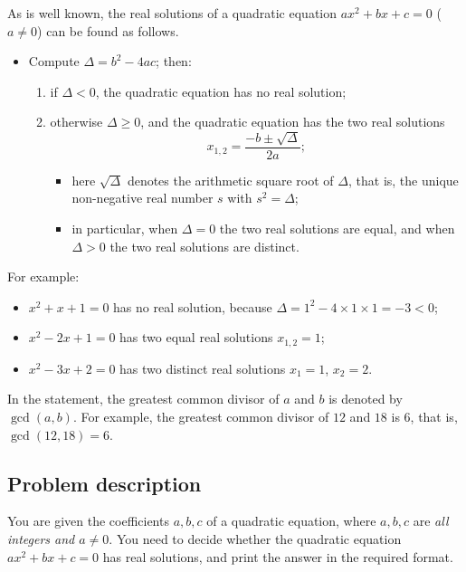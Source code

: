 \documentclass[11pt]{article}
\begin{document}
As is well known, the real solutions of a quadratic equation
$ax^2 + bx + c = 0$ ($a \ne 0$) can be found as follows.
\begin{itemize}
\item Compute $\Delta = b^2 - 4ac$; then:
  \begin{enumerate}
  \item if $\Delta < 0$, the quadratic equation has no real solution;
  \item otherwise $\Delta \ge 0$, and the quadratic equation has the two
    real solutions
    \[
      x_{1,2} = \frac{-b \pm \sqrt{\Delta}}{2a};
    \]
    \begin{itemize}
    \item here $\sqrt{\Delta}$ denotes the arithmetic square root of
      $\Delta$, that is, the unique non-negative real number $s$ with
      $s^2 = \Delta$;
    \item in particular, when $\Delta = 0$ the two real solutions are
      equal, and when $\Delta > 0$ the two real solutions are distinct.
    \end{itemize}
  \end{enumerate}
\end{itemize}
For example:
\begin{itemize}
\item $x^2 + x + 1 = 0$ has no real solution, because
  $\Delta = 1^2 - 4 \times 1 \times 1 = -3 < 0$;
\item $x^2 - 2x + 1 = 0$ has two equal real solutions $x_{1,2} = 1$;
\item $x^2 - 3x + 2 = 0$ has two distinct real solutions $x_1 = 1$,
  $x_2 = 2$.
\end{itemize}
In the statement, the greatest common divisor of $a$ and $b$ is denoted by
$\gcd(a, b)$.
For example, the greatest common divisor of $12$ and $18$ is $6$,
that is, $\gcd(12, 18) = 6$.

\subsection*{Problem description}

You are given the coefficients $a, b, c$ of a quadratic equation, where
$a, b, c$ are \emph{all integers and $a \ne 0$}.
You need to decide whether the quadratic equation $ax^2 + bx + c = 0$ has
real solutions, and print the answer in the required format.
\end{document}

